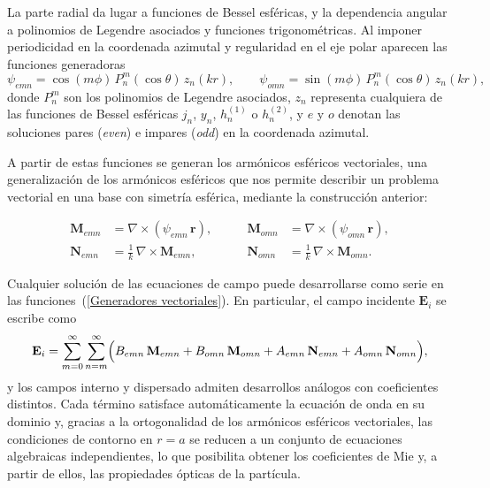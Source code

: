 La parte radial da lugar a funciones de Bessel esféricas, y la dependencia
angular a polinomios de Legendre asociados y funciones trigonométricas. Al
imponer periodicidad en la coordenada azimutal y regularidad en el eje polar
aparecen las funciones generadoras
\begin{equation}
  \psi_{emn} = \cos(m\phi)\,P_{n}^{m}(\cos\theta)\,z_{n}(kr),
  \qquad
  \psi_{omn} = \sin(m\phi)\,P_{n}^{m}(\cos\theta)\,z_{n}(kr),
\end{equation}
donde $P_{n}^{m}$ son los polinomios de Legendre asociados, $z_{n}$ representa
cualquiera de las funciones de Bessel esféricas $j_n$, $y_n$, $h_n^{(1)}$ o
$h_n^{(2)}$, y $e$ y $o$ denotan las soluciones pares (\textit{even}) e 
impares (\textit{odd}) en la coordenada azimutal.

A partir de estas funciones se generan los armónicos esféricos vectoriales, 
una generalización de los armónicos esféricos que nos permite describir un 
problema vectorial en una base con simetría esférica,
mediante la construcción anterior:

\begin{equation}
\label{Generadores vectoriales}
\begin{aligned}
\mathbf{M}_{emn} &= \nabla \times (\psi_{emn}\,\mathbf{r}),
&\qquad
\mathbf{M}_{omn} &= \nabla \times (\psi_{omn}\,\mathbf{r}),
\\
\mathbf{N}_{emn} &= \frac{1}{k}\,\nabla \times \mathbf{M}_{emn},
&\qquad
\mathbf{N}_{omn} &= \frac{1}{k}\,\nabla \times \mathbf{M}_{omn}.
\end{aligned}
\end{equation}

Cualquier solución de las ecuaciones de campo puede desarrollarse como serie en
las funciones~(\ref{Generadores vectoriales}). En particular, el campo
incidente $\mathbf{E}_i$ se escribe como
\begin{equation}
  \mathbf{E}_i =
  \sum_{m=0}^{\infty}\sum_{n=m}^{\infty}
  \Bigl(
    B_{emn}\,\mathbf{M}_{emn}
  + B_{omn}\,\mathbf{M}_{omn}
  + A_{emn}\,\mathbf{N}_{emn}
  + A_{omn}\,\mathbf{N}_{omn}
  \Bigr),
\end{equation}
y los campos interno y dispersado admiten desarrollos análogos con coeficientes
distintos. Cada término satisface automáticamente la ecuación de onda en su
dominio y, gracias a la ortogonalidad de los armónicos esféricos vectoriales,
las condiciones de contorno en $r = a$ se reducen a un conjunto de ecuaciones
algebraicas independientes, lo que posibilita obtener los coeficientes de Mie
y, a partir de ellos, las propiedades ópticas de la partícula.



